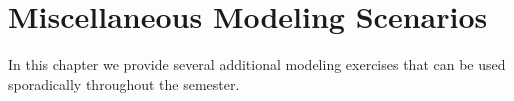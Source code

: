 \chapter{Miscellaneous Modeling Scenarios}
In this chapter we provide several additional modeling exercises that can be used
sporadically throughout the semester.


